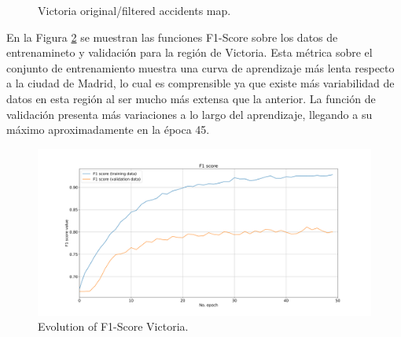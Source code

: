 \documentclass{uathesis-es}
\begin{document}
{ \begin{figure}[H]
     \centering
     \caption{Victoria original/filtered accidents map.}
     \label{VictoriaAccidentsMap}
 \end{figure}


En la Figura \ref{VictoriaLossFunction} se muestran las funciones F1-Score sobre los datos de entrenamineto y validación para la región de Victoria. Esta métrica sobre el conjunto de entrenamiento muestra una curva de aprendizaje más lenta respecto a la ciudad de Madrid, lo cual es comprensible ya que existe más variabilidad de datos en esta región al ser mucho más extensa que la anterior. La función de validación presenta más variaciones a lo largo del aprendizaje, llegando a su máximo aproximadamente en la época 45.

\begin{figure}[H]
\centering
    \includegraphics[width=160mm]{Figures/Victoria/Victoria_convolution_2d_f1_score_paper.png}
    \caption{Evolution of F1-Score Victoria.}
\label{VictoriaLossFunction}
\end{figure}

}
\end{document}
